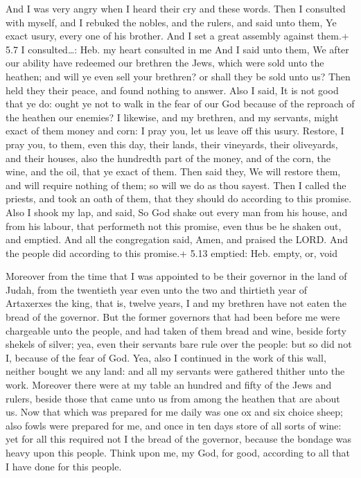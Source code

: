  And I was very angry when I heard their cry and these
words.  Then I consulted with myself, and I rebuked the
nobles, and the rulers, and said unto them, Ye exact usury, every one of
his brother. And I set a great assembly against them.+ 5.7 I
consulted\ldots: Heb. my heart consulted in me  And I said
unto them, We after our ability have redeemed our brethren the Jews,
which were sold unto the heathen; and will ye even sell your brethren?
or shall they be sold unto us? Then held they their peace, and found
nothing to answer.  Also I said, It is not good that ye do:
ought ye not to walk in the fear of our God because of the reproach of
the heathen our enemies?  I likewise, and my brethren, and
my servants, might exact of them money and corn: I pray you, let us
leave off this usury.  Restore, I pray you, to them, even
this day, their lands, their vineyards, their oliveyards, and their
houses, also the hundredth part of the money, and of the corn, the wine,
and the oil, that ye exact of them.  Then said they, We
will restore them, and will require nothing of them; so will we do as
thou sayest. Then I called the priests, and took an oath of them, that
they should do according to this promise.  Also I shook my
lap, and said, So God shake out every man from his house, and from his
labour, that performeth not this promise, even thus be he shaken out,
and emptied. And all the congregation said, Amen, and praised the LORD.
And the people did according to this promise.+ 5.13 emptied: Heb. empty,
or, void

 Moreover from the time that I was appointed to be their
governor in the land of Judah, from the twentieth year even unto the two
and thirtieth year of Artaxerxes the king, that is, twelve years, I and
my brethren have not eaten the bread of the governor.  But
the former governors that had been before me were chargeable unto the
people, and had taken of them bread and wine, beside forty shekels of
silver; yea, even their servants bare rule over the people: but so did
not I, because of the fear of God.  Yea, also I continued
in the work of this wall, neither bought we any land: and all my
servants were gathered thither unto the work.  Moreover
there were at my table an hundred and fifty of the Jews and rulers,
beside those that came unto us from among the heathen that are about us.
 Now that which was prepared for me daily was one ox and
six choice sheep; also fowls were prepared for me, and once in ten days
store of all sorts of wine: yet for all this required not I the bread of
the governor, because the bondage was heavy upon this people.
 Think upon me, my God, for good, according to all that I
have done for this people.

